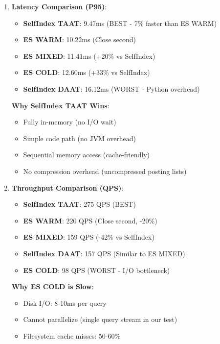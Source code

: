 \documentclass[12pt,a4paper]{article}
\begin{document}
\begin{enumerate}
    \item \textbf{Latency Comparison (P95)}:
    \begin{itemize}
        \item \textbf{SelfIndex TAAT}: 9.47ms (BEST - 7\% faster than ES WARM)
        \item \textbf{ES WARM}: 10.22ms (Close second)
        \item \textbf{ES MIXED}: 11.41ms (+20\% vs SelfIndex)
        \item \textbf{ES COLD}: 12.60ms (+33\% vs SelfIndex)
        \item \textbf{SelfIndex DAAT}: 16.12ms (WORST - Python overhead)
    \end{itemize}
    
    \textbf{Why SelfIndex TAAT Wins}:
    \begin{itemize}
        \item Fully in-memory (no I/O wait)
        \item Simple code path (no JVM overhead)
        \item Sequential memory access (cache-friendly)
        \item No compression overhead (uncompressed posting lists)
    \end{itemize}
    
    \item \textbf{Throughput Comparison (QPS)}:
    \begin{itemize}
        \item \textbf{SelfIndex TAAT}: 275 QPS (BEST)
        \item \textbf{ES WARM}: 220 QPS (Close second, -20\%)
        \item \textbf{ES MIXED}: 159 QPS (-42\% vs SelfIndex)
        \item \textbf{SelfIndex DAAT}: 157 QPS (Similar to ES MIXED)
        \item \textbf{ES COLD}: 98 QPS (WORST - I/O bottleneck)
    \end{itemize}
    
    \textbf{Why ES COLD is Slow}:
    \begin{itemize}
        \item Disk I/O: 8-10ms per query
        \item Cannot parallelize (single query stream in our test)
        \item Filesystem cache misses: 50-60\%
    \end{itemize}
    

\end{enumerate}
\end{document}
